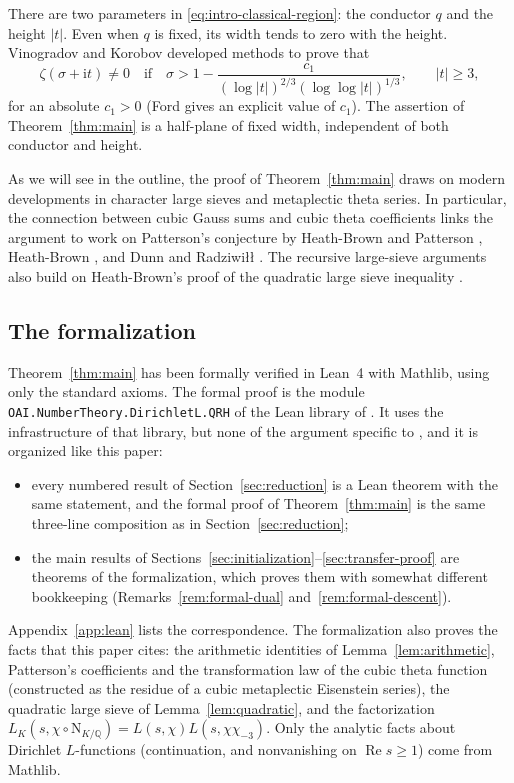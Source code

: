 \documentclass[11pt,a4paper]{article}
\numberwithin{equation}{section}
\numberwithin{figure}{section}
\theoremstyle{definition}
\theoremstyle{remark}
\newcommand{\Q}{\mathbb Q}
\newcommand{\NK}{\mathrm N_{K/\Q}}
\newcommand{\Rea}{\operatorname{Re}}
\begin{document}
There are two parameters in \eqref{eq:intro-classical-region}:
the conductor $q$ and the height $|t|$. Even when $q$ is fixed,
its width tends to zero with the height. Vinogradov and Korobov
developed methods \cite{Vin58,Kor58} to prove that
\begin{equation}\label{eq:intro-vk-region}
 \zeta(\sigma+\mathrm i t)\ne0
 \quad\text{if}\quad
 \sigma>1-\frac{c_1}
 { (\log|t|)^{2/3}(\log\log|t|)^{1/3}},\qquad |t|\ge3,
\end{equation}
for an absolute $c_1>0$ (Ford \cite{Ford02} gives an explicit value of $c_1$). The assertion
of Theorem~\ref{thm:main} is a half-plane of fixed width, independent
of both conductor and height.

As we will see in the outline, the proof of Theorem~\ref{thm:main} draws on
modern developments in character large sieves and metaplectic theta series.
In particular, the connection between cubic Gauss sums and cubic theta
coefficients \cite{Kub69,Pat77} links the argument to work on Patterson's
conjecture by Heath-Brown and Patterson \cite{HBP79}, Heath-Brown
\cite{HB00}, and Dunn and Radziwi\l\l{} \cite{DR}.
The recursive large-sieve arguments also build on Heath-Brown's proof of
the quadratic large sieve inequality \cite{HB95}.

\subsection{The formalization}\label{sec:formal}
Theorem~\ref{thm:main} has been formally verified in Lean~4 with Mathlib, using only the
standard axioms. The formal proof is the module \texttt{OAI.NumberTheory.\allowbreak DirichletL.\allowbreak QRH} of the
Lean library of \cite{OpenAI26}. It uses the infrastructure of that library, but none of the
argument specific to \cite{OpenAI26}, and it is organized like this paper:
\begin{itemize}
\item every numbered result of Section~\ref{sec:reduction} is a Lean theorem with the same
statement, and the formal proof of Theorem~\ref{thm:main} is the same three-line composition as
in Section~\ref{sec:reduction};
\item the main results of Sections~\ref{sec:initialization}--\ref{sec:transfer-proof} are
theorems of the formalization, which proves them with somewhat different bookkeeping
(Remarks~\ref{rem:formal-dual} and~\ref{rem:formal-descent}).
\end{itemize}
Appendix~\ref{app:lean} lists the correspondence. The formalization also proves the facts that
this paper cites: the arithmetic identities of Lemma~\ref{lem:arithmetic}, Patterson's
coefficients and the transformation law of the cubic theta function (constructed as the residue
of a cubic metaplectic Eisenstein series), the quadratic large sieve of Lemma~\ref{lem:quadratic},
and the factorization $L_K(s,\chi\circ\NK)=L(s,\chi)L(s,\chi\chi_{-3})$. Only the analytic facts
about Dirichlet $L$-functions (continuation, and nonvanishing on $\Rea s\ge1$) come from Mathlib.
\end{document}
